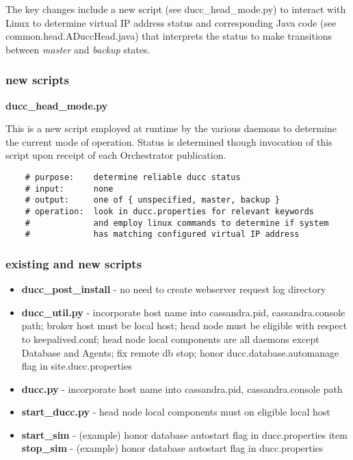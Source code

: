 \documentclass[letterpaper]{article}
\begin{document}
The key changes include a new script (see ducc\_head\_mode.py) to 
interact with Linux to determine virtual IP address status and 
corresponding Java code (see common.head.ADuccHead.java)
that interprets the status to make transitions between 
{\em master} and {\em backup} states.

\subsubsection{new scripts}

\textbf{ducc\_head\_mode.py}

This is a new script employed at runtime by the various daemons to
determine the current mode of operation.  Status is determined 
though invocation of this script upon receipt of each Orchestrator
publication.

   \begin{verbatim}
    # purpose:    determine reliable ducc status
    # input:      none
    # output:     one of { unspecified, master, backup }
    # operation:  look in ducc.properties for relevant keywords
    #             and employ linux commands to determine if system
    #             has matching configured virtual IP address
   \end{verbatim}

\subsubsection{existing and new scripts}

{\renewcommand\labelitemi{}
\begin{itemize}
  \item \textbf{ducc\_post\_install} - no need to create webserver request log directory
  \item \textbf{ducc\_util.py} - incorporate host name into cassandra.pid, cassandra.console path; broker host must be local host; head node must be eligible with respect to keepalived.conf; head node local components are all daemons except Database and Agents; fix remote db stop; honor ducc.database.automanage flag in site.ducc.properties
  \item \textbf{ducc.py} - incorporate host name into cassandra.pid, cassandra.console path
  \item \textbf{start\_ducc.py} - head node local components must  on eligible local host
  \item \textbf{start\_sim} - (example) honor database autostart flag in ducc.properties
  item \textbf{stop\_sim} - (example) honor database autostart flag in ducc.properties
\end{itemize}
}
\end{document}
